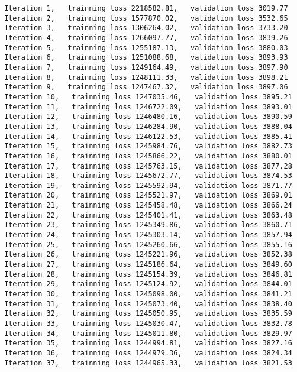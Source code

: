 \documentclass[11pt]{article}
\begin{document}
    \begin{Verbatim}[commandchars=\\\{\}]
Iteration 1,   trainning loss 2218582.81,   validation loss 3019.77
Iteration 2,   trainning loss 1577870.02,   validation loss 3532.65
Iteration 3,   trainning loss 1306264.02,   validation loss 3733.20
Iteration 4,   trainning loss 1266097.77,   validation loss 3839.26
Iteration 5,   trainning loss 1255187.13,   validation loss 3880.03
Iteration 6,   trainning loss 1251088.68,   validation loss 3893.93
Iteration 7,   trainning loss 1249164.49,   validation loss 3897.90
Iteration 8,   trainning loss 1248111.33,   validation loss 3898.21
Iteration 9,   trainning loss 1247467.32,   validation loss 3897.06
Iteration 10,   trainning loss 1247035.46,   validation loss 3895.21
Iteration 11,   trainning loss 1246722.09,   validation loss 3893.01
Iteration 12,   trainning loss 1246480.16,   validation loss 3890.59
Iteration 13,   trainning loss 1246284.90,   validation loss 3888.04
Iteration 14,   trainning loss 1246122.53,   validation loss 3885.41
Iteration 15,   trainning loss 1245984.76,   validation loss 3882.73
Iteration 16,   trainning loss 1245866.22,   validation loss 3880.01
Iteration 17,   trainning loss 1245763.15,   validation loss 3877.28
Iteration 18,   trainning loss 1245672.77,   validation loss 3874.53
Iteration 19,   trainning loss 1245592.94,   validation loss 3871.77
Iteration 20,   trainning loss 1245521.97,   validation loss 3869.01
Iteration 21,   trainning loss 1245458.48,   validation loss 3866.24
Iteration 22,   trainning loss 1245401.41,   validation loss 3863.48
Iteration 23,   trainning loss 1245349.86,   validation loss 3860.71
Iteration 24,   trainning loss 1245303.14,   validation loss 3857.94
Iteration 25,   trainning loss 1245260.66,   validation loss 3855.16
Iteration 26,   trainning loss 1245221.96,   validation loss 3852.38
Iteration 27,   trainning loss 1245186.64,   validation loss 3849.60
Iteration 28,   trainning loss 1245154.39,   validation loss 3846.81
Iteration 29,   trainning loss 1245124.92,   validation loss 3844.01
Iteration 30,   trainning loss 1245098.00,   validation loss 3841.21
Iteration 31,   trainning loss 1245073.40,   validation loss 3838.40
Iteration 32,   trainning loss 1245050.95,   validation loss 3835.59
Iteration 33,   trainning loss 1245030.47,   validation loss 3832.78
Iteration 34,   trainning loss 1245011.80,   validation loss 3829.97
Iteration 35,   trainning loss 1244994.81,   validation loss 3827.16
Iteration 36,   trainning loss 1244979.36,   validation loss 3824.34
Iteration 37,   trainning loss 1244965.33,   validation loss 3821.53

\end{Verbatim}
\end{document}
